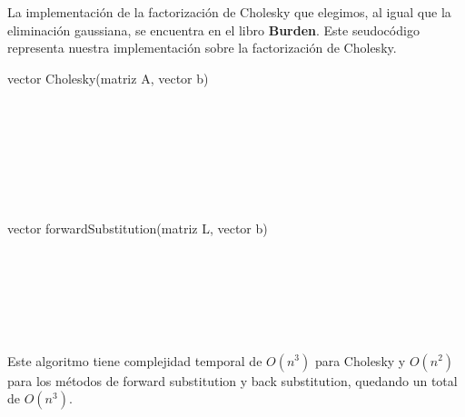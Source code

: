 La implementación de la factorización de Cholesky que elegimos, al igual que la eliminación gaussiana, se encuentra en el libro \textbf{Burden}.
Este seudocódigo representa nuestra implementación sobre la factorización de Cholesky.

\begin{algorithm}
    \begin{algorithmic}[1]\parskip=2mm
        \caption{vector Cholesky(matriz A, vector b)}
        \\
        \\
        \\
        \\
        \\
        \\
    \end{algorithmic}
\end{algorithm}

\begin{algorithm}
    \begin{algorithmic}[1]\parskip=2mm
        \caption{vector forwardSubstitution(matriz L, vector b)}
        \\ 
        \\
        \\
        \\
        \\
      \end{algorithmic}
\end{algorithm}

Este algoritmo tiene complejidad temporal de $O(n^3)$ para Cholesky y $O(n^2)$ para los métodos de forward substitution y back substitution, quedando un total de $O(n^3)$.

\newpage

